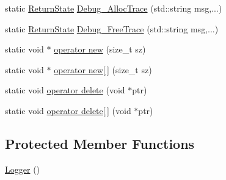 \begin{DoxyCompactItemize}
\item 
static \hyperlink{namespace_osiris_i_a8f53bf938dc75c65c6a529694514013e}{Return\-State} \hyperlink{class_osiris_i_1_1_utilities_1_1_logger_a3b637152503e42516f9f7547adc3469a}{Debug\-\_\-\-Alloc\-Trace} (std\-::string msg,...)
\item 
static \hyperlink{namespace_osiris_i_a8f53bf938dc75c65c6a529694514013e}{Return\-State} \hyperlink{class_osiris_i_1_1_utilities_1_1_logger_ab1581c1795c1f36b65f970c3f421518c}{Debug\-\_\-\-Free\-Trace} (std\-::string msg,...)
\item 
static void $\ast$ \hyperlink{class_osiris_i_1_1_utilities_1_1_logger_a5e9f82a05eba8dde8e91664fde91ccf9}{operator new} (size\-\_\-t sz)
\item 
static void $\ast$ \hyperlink{class_osiris_i_1_1_utilities_1_1_logger_ad6c26f05a8ebfa49d988461ddcd6b822}{operator new\mbox{[}$\,$\mbox{]}} (size\-\_\-t sz)
\item 
static void \hyperlink{class_osiris_i_1_1_utilities_1_1_logger_a634f8705c6d51509d0bda7e728592425}{operator delete} (void $\ast$ptr)
\item 
static void \hyperlink{class_osiris_i_1_1_utilities_1_1_logger_a01a208257ea38572aa4ee604d124087e}{operator delete\mbox{[}$\,$\mbox{]}} (void $\ast$ptr)
\end{DoxyCompactItemize}
\subsection*{Protected Member Functions}
\begin{DoxyCompactItemize}
\item 
\hyperlink{class_osiris_i_1_1_utilities_1_1_logger_abd95dcc5a51f1cf4819b1510c469da5b}{Logger} ()
\end{DoxyCompactItemize}
